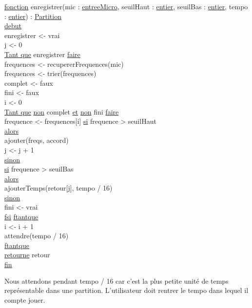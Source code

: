 \documentclass{article}
\begin{document}
\begin{tabbing}
\ul{fonction} enregistrer(mic : \ul{entreeMicro}, seuilHaut :  \ul{entier}, seuilBas : \ul{entier}, tempo : \ul{entier}) : \ul{Partition}\\
\ul{debut}\\
enregistrer <- vrai\\
j <- 0\\
\ul{Tant que} enregistrer \ul{faire}\\
    frequences <- recupererFrequences(mic)\\
    frequences <- trier(frequences)\\
    complet <- faux\\
    fini <- faux\\
    i <- 0 \\
    \ul{Tant que} \ul{non} complet \ul{et} \ul{non} fini \ul{faire}\\
        frequence <- frequences[i]
        \ul{si} frequence > seuilHaut\\
        \ul{alors}\\
            ajouter(freqs, accord)\\
            j <- j + 1\\
        \ul{sinon}\\
            \ul{si} frequence > seuilBas\\
            \ul{alors}\\ 
                ajouterTemps(retour[j], tempo / 16)\\
            \ul{sinon}\\
                fini <- vrai\\
        \ul{fsi}
    \ul{ftantque}\\     
    i <- i + 1\\  
    attendre(tempo / 16)\\
\ul{ftantque}\\
\ul{retourne} retour \\
\ul{fin}\\
\end{tabbing}

Nous attendons pendant tempo / 16 car c'est la plus petite unité de temps représentable dans une partition. L'utilisateur doit rentrer le tempo dans lequel il compte jouer.
\end{document}
